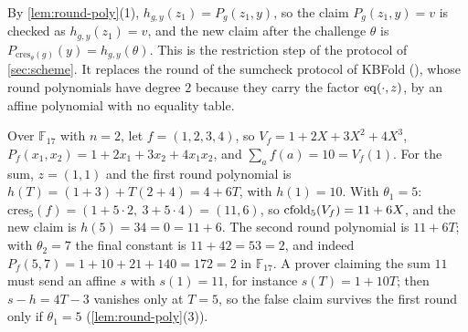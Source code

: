 By \cref{lem:round-poly}(1), $h_{g,y}(z_1) = P_g(z_1, y)$, so the claim $P_g(z_1, y) = v$ is checked as $h_{g,y}(z_1) = v$, and the new claim after the challenge $\theta$ is $P_{\mathrm{cres}_\theta(g)}(y) = h_{g,y}(\theta)$.
This is the restriction step of the protocol of \cref{sec:scheme}.
It replaces the round of the sumcheck protocol of KBFold (), whose round polynomials have degree $2$ because they carry the factor $\mathrm{eq}(\cdot, z)$, by an affine polynomial with no equality table.

\begin{example}\label{ex:f17}
Over $\mathbb{F}_{17}$ with $n = 2$, let $f = (1, 2, 3, 4)$, so $V_f = 1 + 2X + 3X^2 + 4X^3$, $P_f(x_1,x_2) = 1 + 2x_1 + 3x_2 + 4x_1x_2$, and $\sum_a f(a) = 10 = V_f(1)$.
For the sum, $z = (1,1)$ and the first round polynomial is $h(T) = (1 + 3) + T(2 + 4) = 4 + 6T$, with $h(1) = 10$.
With $\theta_1 = 5$: $\mathrm{cres}_5(f) = (1 + 5\cdot 2,\ 3 + 5 \cdot 4) = (11, 6)$, so $\mathrm{cfold}_5(V_f) = 11 + 6X$, and the new claim is $h(5) = 34 = 0 = 11 + 6$.
The second round polynomial is $11 + 6T$; with $\theta_2 = 7$ the final constant is $11 + 42 = 53 = 2$, and indeed $P_f(5, 7) = 1 + 10 + 21 + 140 = 172 = 2$ in $\mathbb{F}_{17}$.
A prover claiming the sum $11$ must send an affine $s$ with $s(1) = 11$, for instance $s(T) = 1 + 10T$; then $s - h = 4T - 3$ vanishes only at $T = 5$, so the false claim survives the first round only if $\theta_1 = 5$ (\cref{lem:round-poly}(3)).
\end{example}
